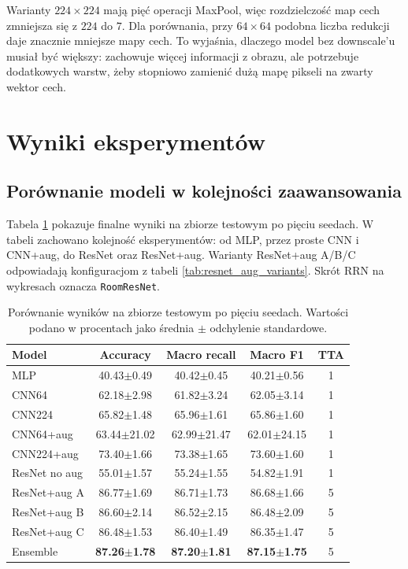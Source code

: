 \documentclass[12pt,a4paper]{article}
\begin{document}
Warianty \(224 \times 224\) mają pięć operacji MaxPool, więc rozdzielczość map cech zmniejsza się z \(224\) do \(7\). Dla porównania, przy \(64 \times 64\) podobna liczba redukcji daje znacznie mniejsze mapy cech. To wyjaśnia, dlaczego model bez downscale'u musiał być większy: zachowuje więcej informacji z obrazu, ale potrzebuje dodatkowych warstw, żeby stopniowo zamienić dużą mapę pikseli na zwarty wektor cech.

\section{Wyniki eksperymentów}

\subsection{Porównanie modeli w kolejności zaawansowania}

Tabela \ref{tab:main_results} pokazuje finalne wyniki na zbiorze testowym po pięciu seedach. W tabeli zachowano kolejność eksperymentów: od MLP, przez proste CNN i CNN+aug, do ResNet oraz ResNet+aug. Warianty ResNet+aug A/B/C odpowiadają konfiguracjom z tabeli \ref{tab:resnet_aug_variants}. Skrót RRN na wykresach oznacza \texttt{RoomResNet}.

\begin{table}[H]
\centering
\caption{Porównanie wyników na zbiorze testowym po pięciu seedach. Wartości podano w procentach jako średnia \(\pm\) odchylenie standardowe.}
\label{tab:main_results}
\small
\begin{tabular}{@{}lcccc@{}}
\toprule
Model & Accuracy & Macro recall & Macro F1 & TTA \\
\midrule
MLP & 40.43\(\pm\)0.49 & 40.42\(\pm\)0.45 & 40.21\(\pm\)0.56 & 1 \\
CNN64 & 62.18\(\pm\)2.98 & 61.82\(\pm\)3.24 & 62.05\(\pm\)3.14 & 1 \\
CNN224 & 65.82\(\pm\)1.48 & 65.96\(\pm\)1.61 & 65.86\(\pm\)1.60 & 1 \\
CNN64+aug & 63.44\(\pm\)21.02 & 62.99\(\pm\)21.47 & 62.01\(\pm\)24.15 & 1 \\
CNN224+aug & 73.40\(\pm\)1.66 & 73.38\(\pm\)1.65 & 73.60\(\pm\)1.60 & 1 \\
ResNet no aug & 55.01\(\pm\)1.57 & 55.24\(\pm\)1.55 & 54.82\(\pm\)1.91 & 1 \\
ResNet+aug A & 86.77\(\pm\)1.69 & 86.71\(\pm\)1.73 & 86.68\(\pm\)1.66 & 5 \\
ResNet+aug B & 86.60\(\pm\)2.14 & 86.52\(\pm\)2.15 & 86.48\(\pm\)2.09 & 5 \\
ResNet+aug C & 86.48\(\pm\)1.53 & 86.40\(\pm\)1.49 & 86.35\(\pm\)1.47 & 5 \\
Ensemble & \textbf{87.26\(\pm\)1.78} & \textbf{87.20\(\pm\)1.81} & \textbf{87.15\(\pm\)1.75} & 5 \\
\bottomrule
\end{tabular}
\end{table}
\end{document}
